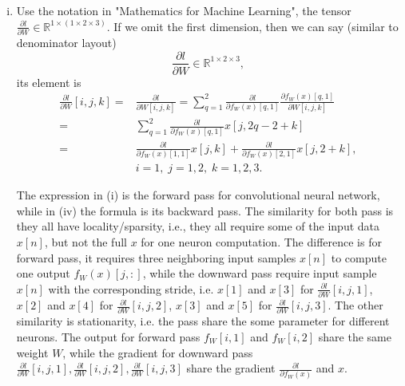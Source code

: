 \documentclass[10pt,a4paper]{article}
\theoremstyle{dotlessP}
\def\RR{\mathbb{R}}
\begin{document}
\begin{enumerate}[(a)]
\begin{enumerate}[(i)]
		\item 
		Use the notation in "Mathematics for Machine Learning", the tensor $\frac{\partial l}{\partial W}\in \RR^{1\times(1\times 2 \times 3)}$. If we omit the first dimension, then we can say (similar to denominator layout)
		\begin{equation}
		\frac{\partial l}{\partial W}\in \RR^{1\times 2 \times 3},
		\end{equation}
		its element is 
		\begin{equation}
		\begin{aligned}
		\frac{\partial l}{\partial W}[i,j,k]=&\frac{\partial l}{\partial W[i,j,k]}
		= \sum_{q=1}^2\frac{\partial l}{\partial f_W(x)[q,1]}\frac{\partial f_W(x)[q,1]}{\partial W[i,j,k]}\\
		=&\sum_{q=1}^2\frac{\partial l}{\partial f_W(x)[q,1]} x[j,2q-2+k]\\
		= &\frac{\partial l}{\partial f_W(x)[1,1]} x[j,k]+\frac{\partial l}{\partial f_W(x)[2,1]} x[j,2+k], \\
		&i=1,\; j=1,2,\; k=1,2,3.
		\end{aligned}
		\end{equation}
		
		The expression in (i) is the forward pass for convolutional neural network, while in (iv) the formula is its backward pass. The similarity for both pass is they all have locality/sparsity, i.e., they all require some of the input data $x[n]$, but not the full $x$ for one neuron computation. The difference is for forward pass, it requires three neighboring input samples $x[n]$ to compute one output $f_W(x)[j,:]$, while the downward pass require input sample $x[n]$ with the corresponding stride, i.e. $x[1]$ and $x[3]$ for $\frac{\partial l}{\partial W}[i,j,1]$, $x[2]$ and $x[4]$ for $\frac{\partial l}{\partial W}[i,j,2]$, $x[3]$ and $x[5]$ for $\frac{\partial l}{\partial W}[i,j,3]$. The other similarity is stationarity, i.e. the pass share the some parameter for different neurons. The output for forward pass $f_W[i,1]$ and $f_W[i,2]$ share the same weight $W$, while the gradient for downward pass $\frac{\partial l}{\partial W}[i,j,1], \frac{\partial l}{\partial W}[i,j,2], \frac{\partial l}{\partial W}[i,j,3]$ share the gradient $\frac{\partial l}{\partial f_W(x)}$ and $x$.
	\end{enumerate}
\end{enumerate}
\newpage
\end{document}
